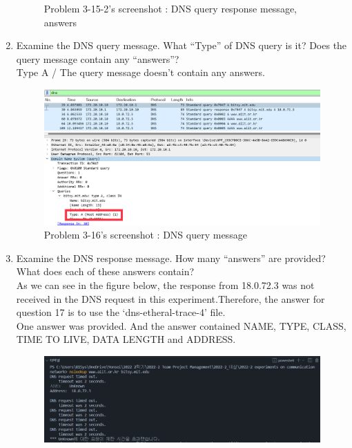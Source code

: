 \begin{enumerate}[label=\bfseries Problem \arabic*:,leftmargin=*,labelindent=1em]
\begin{figure}[!h]
        		\caption{\footnotesize Problem 3-15-2's screenshot : DNS query response message, answers}
        		\vspace{-10pt}
            \end{figure}
        \item Examine the DNS query message. 
        What “Type” of DNS query is it? Does the query message contain any “answers”?\\[0.2mm]
            \soln Type A / The query message doesn’t contain any answers.
            \vspace{-2mm}  
            \begin{figure}[!h]\centering
                \hspace{10mm} 
        		\includegraphics[width=.78\textwidth]{image/result_week01/Q3-g.png}
        		\caption{\footnotesize Problem 3-16's screenshot : DNS query message}
        		\vspace{-10pt}
            \end{figure}
        \item Examine the DNS response message. How many “answers” are provided?
        What does each of these answers contain?\\[0.2mm]
            \soln As we can see in the figure below, the response from 18.0.72.3 was not received in the DNS request in this experiment.Therefore,
            the answer for question 17 is to use the ‘dns-etheral-trace-4’ file.\\
            One answer was provided. And the answer contained NAME, TYPE, CLASS, TIME TO LIVE, DATA LENGTH and ADDRESS.
            \vspace{-2mm}  
            \begin{figure}[!h]\centering
                \hspace{10mm} 
        		\includegraphics[width=.78\textwidth]{image/result_week01/Q3-h-1.png}

\end{figure}
\end{enumerate}
